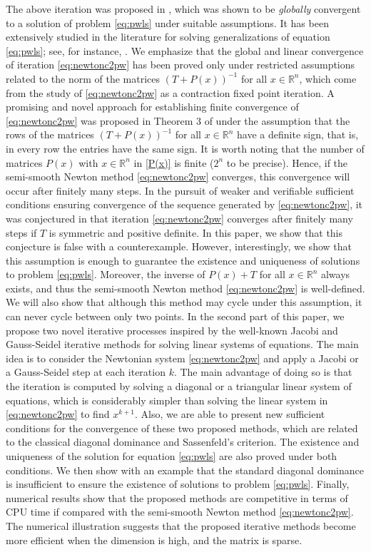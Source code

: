 \documentclass[11pt]{article}
\newcommand{\R}{\mathbb R}
\begin{document}
The above iteration was proposed in \cite{Brugnano:2009}, which was shown to be {\it globally} convergent to a solution of problem \eqref{eq:pwls} under suitable assumptions. It has been extensively studied in the literature for solving generalizations of equation \eqref{eq:pwls}; see, for instance, \cite{Bello-Cruz:2017,Mangasarian:2009a,Ferreira:2015,BelloCruz:2016b}. We emphasize that the global and linear convergence of iteration \eqref{eq:newtonc2pw} has been proved only under restricted assumptions related to the norm of the matrices  $(T+P(x))^{-1}$ for all $x\in \R^n$, which come from the study of \eqref{eq:newtonc2pw} as a contraction fixed point iteration. A promising and novel approach for establishing finite convergence of \eqref{eq:newtonc2pw} was proposed in Theorem $3$ of \cite{Barrios:2016} under the assumption that the rows of the matrices $(T+P(x))^{-1}$ for all $x\in \R^n$ have a definite sign, that is, in every row the entries have the same sign. It is worth noting that the number of matrices $P(x)$ with $x\in \R^n$ in \eqref{P(x)} is finite ($2^n$ to be precise). Hence, if the semi-smooth Newton method \eqref{eq:newtonc2pw} converges, this convergence will occur after finitely many steps. In the pursuit of weaker and verifiable sufficient conditions ensuring convergence of the sequence generated by \eqref{eq:newtonc2pw}, it was conjectured in \cite{Bello-Cruz:2017} that iteration \eqref{eq:newtonc2pw} converges after finitely many steps if $T$ is symmetric and positive definite. In this paper, we show that this conjecture is false with a counterexample. However, interestingly, we show that this assumption is enough to guarantee the existence and uniqueness of solutions to problem \eqref{eq:pwls}. Moreover, the inverse of $P(x)+T$ for all $x\in \R^n$ always exists, and thus the semi-smooth Newton method \eqref{eq:newtonc2pw} is well-defined. We will also show that although this method may cycle under this assumption, it can never cycle between only two points. In the second part of this paper, we propose two novel iterative processes inspired by the well-known Jacobi and Gauss-Seidel iterative methods for solving linear systems of equations. The main idea is to consider the Newtonian system \eqref{eq:newtonc2pw} and apply a Jacobi or a Gauss-Seidel step at each iteration $k$. The main advantage of doing so is that the iteration is computed by solving a diagonal or a triangular linear system of equations, which is considerably simpler than solving the linear system in \eqref{eq:newtonc2pw} to find $x^{k+1}$. Also, we are able to present new sufficient conditions for the convergence of these two proposed methods, which are related to the classical diagonal dominance and Sassenfeld's criterion. The existence and uniqueness of the solution for equation \eqref{eq:pwls} are also proved under both conditions. We then show with an example that the standard diagonal dominance is insufficient to ensure the existence of solutions to problem \eqref{eq:pwls}. Finally, numerical results show that the proposed methods are competitive in terms of CPU time if compared with the semi-smooth Newton method \eqref{eq:newtonc2pw}. The numerical illustration suggests that the proposed iterative methods become more efficient when the dimension is high, and the matrix is sparse. 
\end{document}
